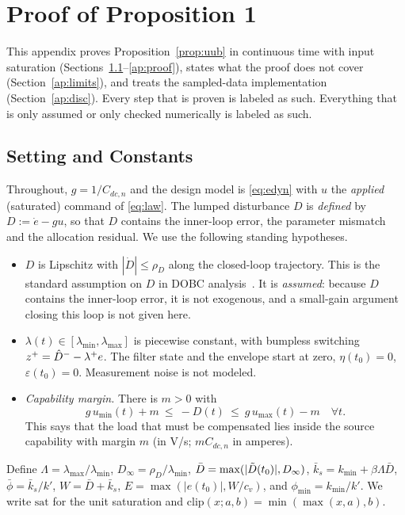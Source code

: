 \section{Proof of Proposition 1}\label{app:proof}





This appendix proves Proposition~\ref{prop:uub} in continuous time with input saturation (Sections~\ref{ap:setting}--\ref{ap:proof}), states what the proof does not cover (Section~\ref{ap:limits}), and treats the sampled-data implementation (Section~\ref{ap:disc}). Every step that is proven is labeled as such. Everything that is only assumed or only checked numerically is labeled as such.

\subsection{Setting and Constants}\label{ap:setting}
Throughout, $g=1/C_{dc,n}$ and the design model is \eqref{eq:edyn} with $u$ the \emph{applied} (saturated) command of \eqref{eq:law}. The lumped disturbance $D$ is \emph{defined} by $D:=\dot e-gu$, so that $D$ contains the inner-loop error, the parameter mismatch and the allocation residual. We use the following standing hypotheses.
\begin{itemize}
\item[(H1)] $D$ is Lipschitz with $|\dot D|\le\rho_D$ along the closed-loop trajectory. This is the standard assumption on $D$ in DOBC analysis~\cite{chen2016dobc}. It is \emph{assumed}: because $D$ contains the inner-loop error, it is not exogenous, and a small-gain argument closing this loop is not given here.
\item[(H2)] $\lambda(t)\in[\lambda_{\min},\lambda_{\max}]$ is piecewise constant, with bumpless switching $z^+=\hat{D}^--\lambda^+e$. The filter state and the envelope start at zero, $\eta(t_0)=0$, $\varepsilon(t_0)=0$. Measurement noise is not modeled.
\item[(H3)] \emph{Capability margin.} There is $m>0$ with
\begin{equation}
g\,u_{\min}(t)+m\ \le\ -D(t)\ \le\ g\,u_{\max}(t)-m\quad\forall t.\label{ap:cap}
\end{equation}
This says that the load that must be compensated lies inside the source capability with margin $m$ (in V/s; $mC_{dc,n}$ in amperes).
\end{itemize}
Define $\Lambda=\lambda_{\max}/\lambda_{\min}$, $D_\infty=\rho_D/\lambda_{\min}$, $\bar D=\max(|\tilde{D}(t_0)|,D_\infty)$, $\bar k_s=k_{\min}+\beta\Lambda\bar D$, $\bar\phi=\bar k_s/k'$, $W=\bar D+\bar k_s$, $E=\max(|e(t_0)|,W/c_v)$, and $\phi_{\min}=k_{\min}/k'$. We write $\mathrm{sat}$ for the unit saturation and $\mathrm{clip}(x;a,b)=\min(\max(x,a),b)$.


